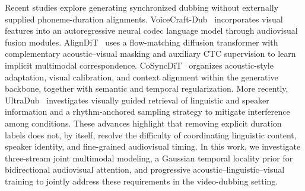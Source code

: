 Recent studies explore generating synchronized dubbing without
externally supplied phoneme-duration alignments.
VoiceCraft-Dub~\cite{sungbin2025voicecraftdub} incorporates visual
features into an autoregressive neural codec language model through
audiovisual fusion modules. AlignDiT~\cite{choi2025aligndit}
uses a flow-matching diffusion transformer with complementary
acoustic--visual masking and auxiliary CTC supervision to learn
implicit multimodal correspondence. CoSyncDiT~\cite{cong2026cosyncdit}
organizes acoustic-style adaptation, visual calibration, and
context alignment within the generative backbone, together with
semantic and temporal regularization. More recently,
UltraDub~\cite{cong2026ultradub} investigates visually guided
retrieval of linguistic and speaker information and a rhythm-anchored
sampling strategy to mitigate interference among conditions.
These advances highlight that removing explicit duration labels
does not, by itself, resolve the difficulty of coordinating linguistic
content, speaker identity, and fine-grained audiovisual timing.
In this work, we investigate three-stream joint multimodal modeling,
a Gaussian temporal locality prior for bidirectional audiovisual
attention, and progressive acoustic--linguistic--visual training
to jointly address these requirements in the video-dubbing setting.
